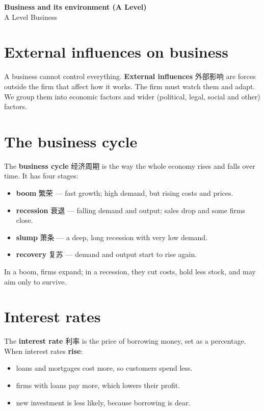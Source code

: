 \documentclass[11pt]{article}
\begin{document}
\begin{center}
  {\LARGE\bfseries Business and its environment (A Level)}\\[0.35em]
  {\large A Level Business}
\end{center}
\vspace{0.6em}

\section*{External influences on business}

A business cannot control everything. \textbf{External influences} 外部影响 are forces outside the firm that affect how it works. The firm must watch them and adapt. We group them into economic factors and wider (political, legal, social and other) factors.

\section*{The business cycle}

The \textbf{business cycle} 经济周期 is the way the whole economy rises and falls over time. It has four stages:

\begin{itemize}
\item \textbf{boom} 繁荣 — fast growth; high demand, but rising costs and prices.

\item \textbf{recession} 衰退 — falling demand and output; sales drop and some firms close.

\item \textbf{slump} 萧条 — a deep, long recession with very low demand.

\item \textbf{recovery} 复苏 — demand and output start to rise again.

\end{itemize}

In a boom, firms expand; in a recession, they cut costs, hold less stock, and may aim only to survive.

\section*{Interest rates}

The \textbf{interest rate} 利率 is the price of borrowing money, set as a percentage. When interest rates \textbf{rise}:

\begin{itemize}
\item loans and mortgages cost more, so customers spend less.

\item firms with loans pay more, which lowers their profit.

\item new investment is less likely, because borrowing is dear.

\end{itemize}
\end{document}
